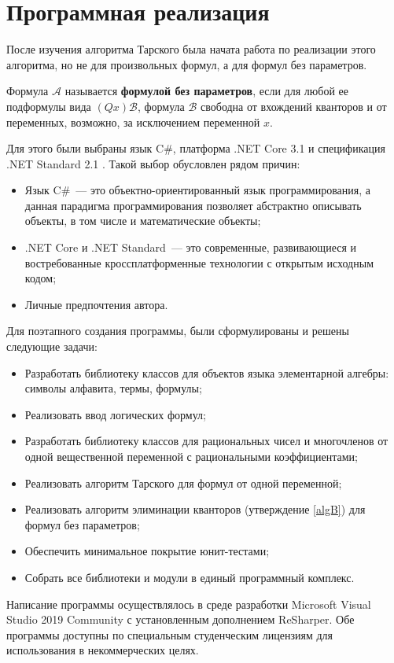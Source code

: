 \section{Программная реализация}

После изучения алгоритма Тарского была начата работа по реализации этого алгоритма, но не для произвольных формул, а для формул без параметров.

\begin{definition}
    Формула $\mathcal{A}$ называется \textbf{формулой без параметров}, если для любой ее подформулы вида $(Qx)\mathcal{B}$, формула $\mathcal{B}$ свободна от вхождений кванторов и от переменных, возможно, за исключением переменной $x$.
\end{definition}

Для этого были выбраны язык C\#, платформа .NET Core 3.1 и спецификация .NET Standard 2.1 \cite{TroelsonNet}. Такой выбор обусловлен рядом причин:
\begin{itemize}
    \item Язык C\#~--- это объектно-ориентированный язык программирования, а данная парадигма программирования позволяет абстрактно описывать объекты, в том числе и математические объекты; 
    \item .NET Core и .NET Standard~--- это современные, развивающиеся и востребованные кроссплатформенные технологии с открытым исходным кодом;
    \item Личные предпочтения автора.
\end{itemize}
Для поэтапного создания программы, были сформулированы и решены следующие задачи:
\begin{itemize}
    \item Разработать библиотеку классов для объектов языка элементарной алгебры: символы алфавита, термы, формулы;
    \item Реализовать ввод логических формул;
    \item Разработать библиотеку классов для рациональных чисел и многочленов от одной вещественной переменной с рациональными коэффициентами;
    \item Реализовать алгоритм Тарского для формул от одной переменной;
    \item Реализовать алгоритм элиминации кванторов (утверждение \ref{algB}) для формул без параметров;
    \item Обеспечить минимальное покрытие юнит-тестами;
    \item Собрать все библиотеки и модули в единый программный комплекс.
\end{itemize}
Написание программы осуществлялось в среде разработки Microsoft Visual Studio 2019 Community с установленным дополнением ReSharper. Обе программы доступны по специальным студенческим лицензиям для использования в некоммерческих целях.

